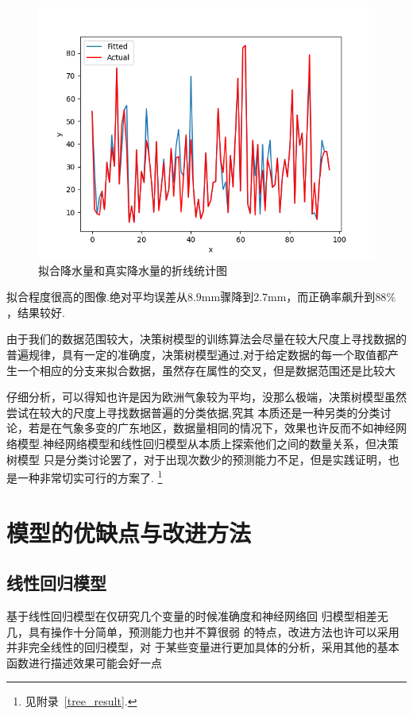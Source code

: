 \documentclass[UTF8, a4paper]{ctexart}
\begin{document}
\begin{figure}[h!]
	\centering
	\includegraphics[scale=0.3]{very_success.png}
	\caption{拟合降水量和真实降水量的折线统计图}\label{pic10}
\end{figure}

拟合程度很高的图像.绝对平均误差从$8.9$\si{\milli\meter}骤降到$2.7$\si{\milli\meter}，而正确率飙升到$88\%$，结果较好.

由于我们的数据范围较大，决策树模型的训练算法会尽量在较大尺度上寻找数据的普遍规律，具有一定的准确度，决策树模型通过,对于给定数据的每一个取值都产生一个相应的分支来拟合数据，虽然存在属性的交叉，但是数据范围还是比较大

仔细分析，可以得知也许是因为欧洲气象较为平均，没那么极端，决策树模型虽然尝试在较大的尺度上寻找数据普遍的分类依据,究其
本质还是一种另类的分类讨论，若是在气象多变的广东地区，数据量相同的情况下，效果也许反而不如神经网
络模型.神经网络模型和线性回归模型从本质上探索他们之间的数量关系，但决策树模型
只是分类讨论罢了，对于出现次数少的预测能力不足，但是实践证明，也是一种非常切实可行的方案了.
\footnote{见附录~\textcolor{red}{\ref{tree_result}}.}


\section{模型的优缺点与改进方法}

\subsection{线性回归模型}
基于线性回归模型在仅研究几个变量的时候准确度和神经网络回
归模型相差无几，具有操作十分简单，预测能力也并不算很弱
的特点，改进方法也许可以采用并非完全线性的回归模型，对
于某些变量进行更加具体的分析，采用其他的基本函数进行描述效果可能会好一点
\end{document}
